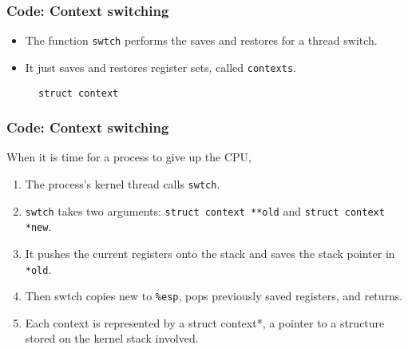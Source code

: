 \documentclass{beamer}
\begin{document}

\begin{frame}[t]
  \frametitle{Code: Context switching}
  \begin{itemize}
  \item The function \texttt{swtch} performs the saves and restores for a thread switch.
  \item It just saves and restores register sets, called \texttt{contexts}.
  \end{itemize}

  \begin{figure}
    
    \caption{\texttt{struct context}}
  \end{figure}
  
\end{frame}


\begin{frame}[t]
  \frametitle{Code: Context switching}
  When it is time for a process to give up the CPU,
  \begin{enumerate}
  \item The process’s kernel thread calls \texttt{swtch}.
  \item \texttt{swtch} takes two arguments: \texttt{struct context **old} and \texttt{struct context *new}.
  \item It pushes the current registers onto the stack and saves the stack pointer in \texttt{*old}.
  \item Then swtch copies new to \texttt{\%esp}, pops previously saved registers, and returns.
  \item Each context is represented by a struct context*, a pointer to a structure stored on the kernel stack involved.
  \end{enumerate}

\end{frame}

\end{document}

